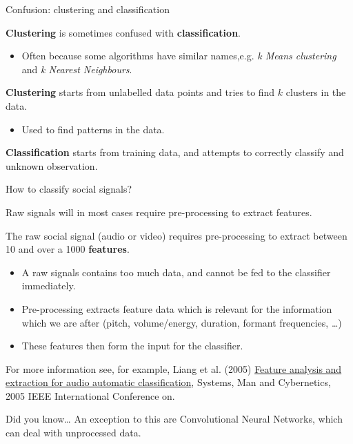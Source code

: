 \documentclass[compress]{beamer}
\begin{document}
\begin{frame}{Confusion: clustering and classification}

\textbf{Clustering} is sometimes confused with \textbf{classification}.

\begin{itemize}

\item
  Often because some algorithms have similar names,e.g. \emph{k Means
  clustering} and \emph{k Nearest Neighbours}.
\end{itemize}

\textbf{Clustering} starts from unlabelled data points and tries to find
\(k\) clusters in the data.

\begin{itemize}

\item
  Used to find patterns in the data.
\end{itemize}

\textbf{Classification} starts from training data, and attempts to
correctly classify and unknown observation.

\end{frame}

\begin{frame}{How to classify social signals?}

Raw signals will in most cases require pre-processing to extract
features.

The raw social signal (audio or video) requires pre-processing to
extract between 10 and over a 1000 \textbf{features}.

\begin{itemize}

\item
  A raw signals contains too much data, and cannot be fed to the
  classifier immediately.
\item
  Pre-processing extracts feature data which is relevant for the
  information which we are after (pitch, volume/energy, duration,
  formant frequencies, \ldots{})
\item
  These features then form the input for the classifier.
\end{itemize}

For more information see, for example, Liang et al. (2005)
\href{http://ieeexplore.ieee.org/xpls/icp.jsp?arnumber=1571239}{Feature
analysis and extraction for audio automatic classification}, Systems,
Man and Cybernetics, 2005 IEEE International Conference on.

Did you know\ldots{} An exception to this are Convolutional Neural
Networks, which can deal with unprocessed data.

\end{frame}
\end{document}
